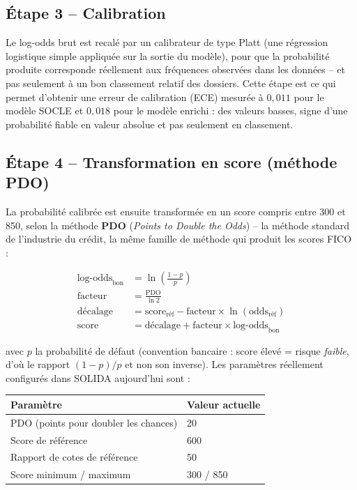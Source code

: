 \documentclass[11pt,a4paper]{article}
\begin{document}
\subsection{Étape 3 -- Calibration}

Le log-odds brut est recalé par un calibrateur de type Platt (une régression logistique simple
appliquée sur la sortie du modèle), pour que la probabilité produite corresponde réellement aux
fréquences observées dans les données -- et pas seulement à un bon classement relatif des
dossiers. Cette étape est ce qui permet d'obtenir une erreur de calibration (ECE) mesurée à
$0{,}011$ pour le modèle SOCLE et $0{,}018$ pour le modèle enrichi : des valeurs basses, signe
d'une probabilité fiable en valeur absolue et pas seulement en classement.

\subsection{Étape 4 -- Transformation en score (méthode PDO)}

La probabilité calibrée est ensuite transformée en un score compris entre 300 et 850, selon la
méthode \textbf{PDO} (\emph{Points to Double the Odds}) -- la méthode standard de l'industrie du
crédit, la même famille de méthode qui produit les scores FICO :

\begin{align}
\text{log-odds}_{\text{bon}} &= \ln\!\left(\frac{1-p}{p}\right) \\
\text{facteur} &= \frac{\text{PDO}}{\ln 2} \\
\text{décalage} &= \text{score}_{\text{réf}} - \text{facteur} \times \ln(\text{odds}_{\text{réf}}) \\
\text{score} &= \text{décalage} + \text{facteur} \times \text{log-odds}_{\text{bon}}
\end{align}

avec $p$ la probabilité de défaut (convention bancaire : score élevé = risque \emph{faible}, d'où
le rapport $(1-p)/p$ et non son inverse). Les paramètres réellement configurés dans SOLIDA
aujourd'hui sont :

\begin{center}
\begin{tabular}{ll}
\toprule
Paramètre & Valeur actuelle \\
\midrule
PDO (points pour doubler les chances) & 20 \\
Score de référence & 600 \\
Rapport de cotes de référence & 50 \\
Score minimum / maximum & 300 / 850 \\
\bottomrule
\end{tabular}
\end{center}
\end{document}

